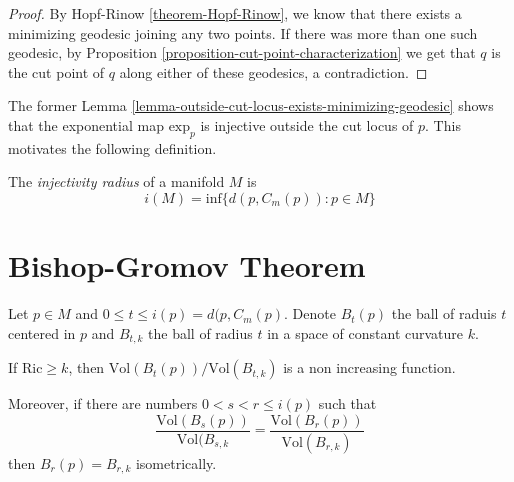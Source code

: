 \begin{proof}
By Hopf-Rinow \ref{theorem-Hopf-Rinow}, we know that
there exists a minimizing geodesic joining any two points. If there was more
than one such geodesic, by 
Proposition \ref{proposition-cut-point-characterization} 
we get that $q$ is the cut point of  $q$ along either of these geodesics, 
a contradiction.
\end{proof}

The former Lemma \ref{lemma-outside-cut-locus-exists-minimizing-geodesic} 
shows that the exponential map $\text{exp}_p$
 is injective outside the cut locus of $p$. 
This motivates the following definition.

\begin{definition}
\label{definition-injectivity-radius}
The {\it injectivity radius} of a manifold $M$ is
$$
i(M)=\text{inf}\{d(p,C_m(p)):p \in M\}
$$
\end{definition}

\section{Bishop-Gromov Theorem}
\label{section-bishop-gromov}

\begin{theorem}
\label{theorem-Bishop-Gromov}
Let $p \in M$ and $0\leq t \leq i(p)=d(p,C_m(p)$. Denote $B_t(p)$ the ball of
raduis $t$ centered in $p$ and $B_{t,k}$ the ball of radius $t$ in a space of
constant curvature $k$.

If $\text{Ric}\geq k$, then $\text{Vol}(B_t(p))/\text{Vol}(B_{t,k})$ is a non
increasing function.

Moreover, if there are numbers  $0<s<r\leq i(p)$ such that
$$
\frac{\text{Vol}(B_s(p))}{\text{Vol}(B_{s,k}}=
\frac{\text{Vol}(B_r(p))}{\text{Vol}(B_{r,k})}
$$
then $B_r(p)=B_{r,k}$ isometrically.
\end{theorem}

